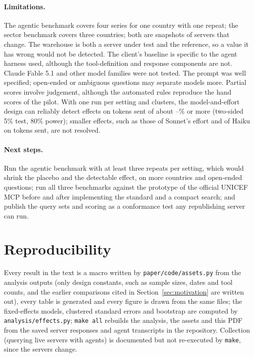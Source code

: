 \documentclass[11pt,a4paper]{article}
\begin{document}
\paragraph{Limitations.} The agentic benchmark covers four series for one country with one repeat; the sector benchmark covers three countries; both are snapshots of servers that change. The warehouse is both a server under test and the reference, so a value it has wrong would not be detected. The client's baseline is specific to the agent harness used, although the tool-definition and response components are not. Claude Fable 5.1 and other model families were not tested. The prompt was well specified; open-ended or ambiguous questions may separate models more. Partial scores involve judgement, although the automated rules reproduce the hand scores of the pilot. With one run per setting and \cells{} clusters, the model-and-effort design can reliably detect effects on tokens sent of about \mdeMin--\mdeMax\% or more (two-sided 5\% test, 80\% power); smaller effects, such as those of Sonnet's effort and of Haiku on tokens sent, are not resolved.

\paragraph{Next steps.} Run the agentic benchmark with at least three repeats per setting, which would shrink the placebo and the detectable effect, on more countries and open-ended questions; run all three benchmarks against the prototype of the official UNICEF MCP before and after implementing the standard and a compact search; and publish the query sets and scoring as a conformance test any republishing server can run.

\section*{Reproducibility}
Every result in the text is a macro written by \texttt{paper/code/assets.py} from the analysis outputs (only design constants, such as sample sizes, dates and tool counts, and the earlier comparisons cited in Section~\ref{sec:motivation} are written out), every table is generated and every figure is drawn from the same files; the fixed-effects models, clustered standard errors and bootstrap are computed by \texttt{analysis/effects.py}; \texttt{make all} rebuilds the analysis, the assets and this PDF from the saved server responses and agent transcripts in the repository. Collection (querying live servers with agents) is documented but not re-executed by \texttt{make}, since the servers change.



\nocite{*}
\end{document}
